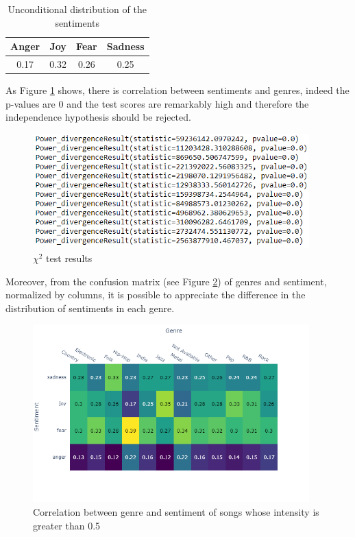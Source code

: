\documentclass[runningheads]{llncs}
\begin{document}
\begin{table}[H]
    \centering
    \begin{tabular}{|c |c |c|c|} 
     \hline
     Anger & Joy & Fear  & Sadness\\ [0.5ex] 
     \hline
     0.17 & 0.32 & 0.26  & 0.25 \\ 
     \hline
    \end{tabular}
     \caption{Unconditional distribution of the sentiments}
    \label{tab:sentimentdistribution}
\end{table}



As Figure \ref{fig:chi_square} shows, there is correlation between sentiments and genres, indeed the p-values are 0 and the test scores are remarkably high and therefore the independence hypothesis should be rejected.
\begin{figure}[H]
    \centering
    \includegraphics[width=0.95\textwidth]{images/chi_squared.PNG}
    \caption{$\chi^2$ test results}
    \label{fig:chi_square}
\end{figure}
Moreover, from the confusion matrix (see Figure \ref{fig:correlations}) of genres and sentiment, normalized by columns, it is possible to appreciate the difference in the distribution of sentiments in each genre.
\begin{figure}[H]
    \centering
    \includegraphics[width=0.95\textwidth]{images/correlation.png}
    \caption{Correlation between genre and sentiment of songs whose intensity is greater than 0.5}
    \label{fig:correlations}
\end{figure}
\end{document}
